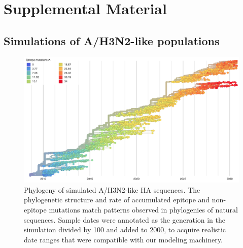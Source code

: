 \setcounter{figure}{0}
\setcounter{table}{0}
\renewcommand{\thefigure}{S\arabic{figure}}
\renewcommand{\thetable}{S\Roman{table}}

\section*{Supplemental Material}

\subsection*{Simulations of A/H3N2-like populations}

\begin{figure}[h]
  \begin{center}
  \includegraphics[width=\textwidth]{figures/simulated-h3n2-ha-phylogeny.png}
  \caption{Phylogeny of simulated A/H3N2-like HA sequences. The phylogenetic structure and rate of accumulated epitope and non-epitope mutations match patterns observed in phylogenies of natural sequences. Sample dates were annotated as the generation in the simulation divided by 100 and added to 2000, to acquire realistic date ranges that were compatible with our modeling machinery.}
  \label{sup_fig:simulated_h3n2_ha_phylogeny}
  \end{center}
\end{figure}

